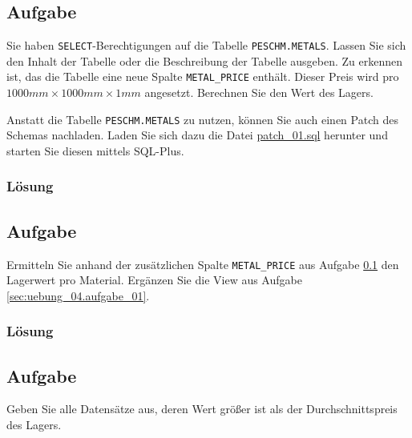 \subsection{Aufgabe}
\label{sec:uebung_04.aufgabe_04}
Sie haben \texttt{SELECT}-Berechtigungen auf die Tabelle \texttt{PESCHM.METALS}. Lassen Sie sich den Inhalt der Tabelle oder die Beschreibung der Tabelle ausgeben. Zu erkennen ist, das die Tabelle eine neue Spalte \texttt{METAL\_PRICE} enthält. Dieser Preis wird pro $1000mm\times1000mm\times1mm$ angesetzt. Berechnen Sie den Wert des Lagers.

\begin{info-popup}
  Anstatt die Tabelle \texttt{PESCHM.METALS} zu nutzen, können Sie auch einen Patch des Schemas nachladen. Laden Sie sich dazu die Datei \href{https://raw.githubusercontent.com/fh-trier/tgdb_ws1819/master/sql/patch_01.sql}{patch\_01.sql} herunter und starten Sie diesen mittels SQL-Plus.
\end{info-popup}

\subsubsection*{Lösung}
\label{sec:uebung_04.aufgabe_04.loesung}

\subsection{Aufgabe}
\label{sec:uebung_04.aufgabe_05}
Ermitteln Sie anhand der zusätzlichen Spalte \texttt{METAL\_PRICE} aus Aufgabe \ref{sec:uebung_04.aufgabe_04} den Lagerwert pro Material. Ergänzen Sie die View aus Aufgabe \ref{sec:uebung_04.aufgabe_01}.

\subsubsection*{Lösung}
\label{sec:uebung_04.aufgabe_05.loesung}

\subsection{Aufgabe}
\label{sec:uebung_04.aufgabe_06}
Geben Sie alle Datensätze aus, deren Wert größer ist als der Durchschnittspreis des Lagers.

